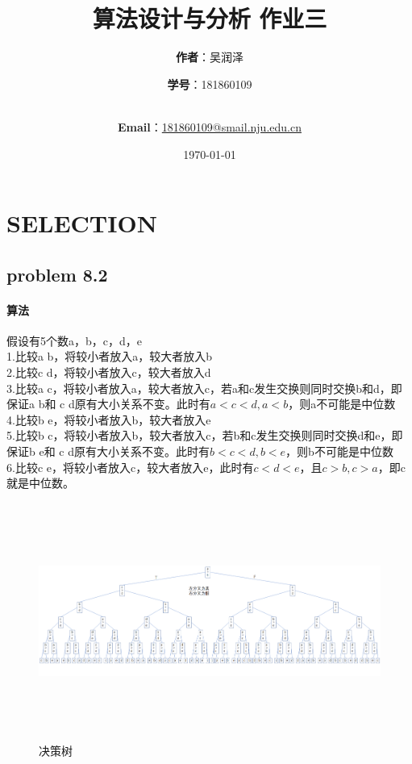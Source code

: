 \documentclass[11pt]{ctexart}
\title{\Huge\textbf{算法设计与分析 作业三}\\}
\author{\Large\textbf{作者}：吴润泽 \and{\Large\textbf{学号}：181860109}\\
	\\
	\and {\Large\textbf{Email}：\href{mailto:181860109@smail.nju.edu.cn}{181860109@smail.nju.edu.cn}}\\}
\date{\Large\today}
\begin{document}
	\maketitle
	\tableofcontents
	\newpage
	\section*{SELECTION}
	\hypertarget{problem 8.2}{\subsection*{problem 8.2}}
	\paragraph{算法}
	假设有5个数a，b，c，d，e\\
	1.比较a b，将较小者放入a，较大者放入b\\
	2.比较c d，将较小者放入c，较大者放入d\\
	3.比较a c，将较小者放入a，较大者放入c，若a和c发生交换则同时交换b和d，即保证a b和
	c d原有大小关系不变。此时有$a<c<d,a<b$，则a不可能是中位数\\
	4.比较b e，将较小者放入b，较大者放入e\\
	5.比较b c，将较小者放入b，较大者放入c，若b和c发生交换则同时交换d和e，即保证b e和
	c d原有大小关系不变。此时有$b<c<d,b<e$，则b不可能是中位数\\
	6.比较c e，\hspace{5pt}将较小者放入c，较大者放入e，此时有$c<d<e$，且$c>b,c>a$，即c就是中位数。\\
	\begin{figure}[h]
		\centering
		\caption{决策树}
		\includegraphics[height=220pt,width=450pt]{tree.png}

	\end{figure}
\end{document}
